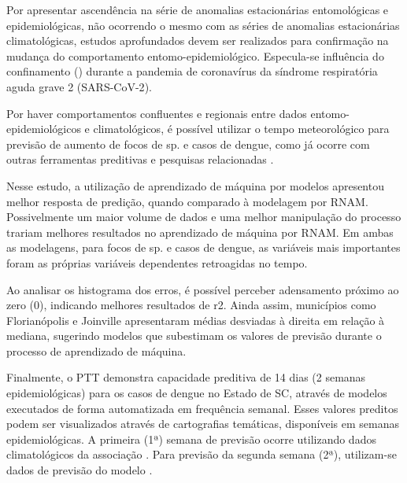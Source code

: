 \indent Por apresentar ascendência na série de anomalias estacionárias entomológicas e epidemiológicas, não ocorrendo o mesmo com as séries de anomalias estacionárias climatológicas, estudos aprofundados devem ser realizados para confirmação na mudança do comportamento entomo-epidemiológico. Especula-se influência do confinamento () durante a pandemia de coronavírus da síndrome respiratória aguda grave 2 (\acrfull{SARS-CoV-2}).

\indent Por haver comportamentos confluentes e regionais entre dados entomo-epidemiológicos  e climatológicos, é possível utilizar o tempo meteorológico para previsão de aumento de focos de  sp. e casos de dengue, como já ocorre com outras ferramentas preditivas e pesquisas relacionadas \cite{Infodengue_2018, ForecastingDengueBrazil2019, Relatorio_Infodengue_2023}.

\indent Nesse estudo, a utilização de aprendizado de máquina por modelos  apresentou melhor resposta de predição, quando comparado à modelagem por \acrfull{RNAM}. Possivelmente um maior volume de dados e uma melhor manipulação do processo trariam melhores resultados no aprendizado de máquina por \acrshort{RNAM}. Em ambas as modelagens,  para focos de  sp. e casos de dengue, as variáveis mais importantes foram as próprias variáveis dependentes retroagidas no tempo.

\indent Ao analisar os histograma dos erros, é possível perceber adensamento próximo ao zero (0), indicando melhores resultados de \acrfull{r2}. Ainda assim, municípios como Florianópolis e Joinville apresentaram médias desviadas à direita em relação à mediana, sugerindo modelos que subestimam os valores de previsão durante o processo de aprendizado de máquina.

\indent Finalmente, o \acrlong{PTT} demonstra capacidade preditiva de 14 dias (2 semanas epidemiológicas) para os casos de dengue no Estado de \acrlong{SC}, através de modelos  executados de forma automatizada em frequência semanal. Esses valores preditos podem ser visualizados através de cartografias temáticas, disponíveis em semanas epidemiológicas. A primeira (1ª) semana de previsão ocorre utilizando dados climatológicos da associação . Para previsão da segunda semana (2ª), utilizam-se dados de previsão do modelo .



